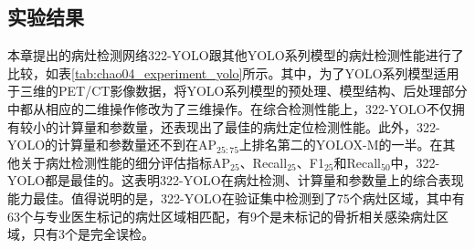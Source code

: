 \subsection{实验结果}

本章提出的病灶检测网络322-YOLO跟其他YOLO系列模型的病灶检测性能进行了比较，如表\ref{tab:chao04_experiment_yolo}所示。其中，为了YOLO系列模型适用于三维的PET/CT影像数据，将YOLO系列模型的预处理、模型结构、后处理部分中都从相应的二维操作修改为了三维操作。在综合检测性能上，322-YOLO不仅拥有较小的计算量和参数量，还表现出了最佳的病灶定位检测性能。此外，322-YOLO的计算量和参数量还不到在AP\(_{25:75}\)上排名第二的YOLOX-M的一半。在其他关于病灶检测性能的细分评估指标AP\(_{25}\)、Recall\(_{25}\)、F1\(_{25}\)和Recall\(_{50}\)中，322-YOLO都是最佳的。这表明322-YOLO在病灶检测、计算量和参数量上的综合表现能力最佳。值得说明的是，322-YOLO在验证集中检测到了75个病灶区域，其中有63个与专业医生标记的病灶区域相匹配，有9个是未标记的骨折相关感染病灶区域，只有3个是完全误检。

